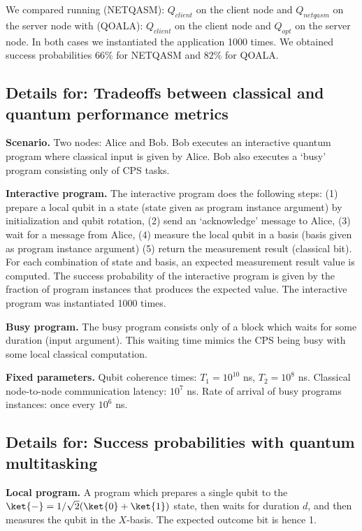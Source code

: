 We compared running (NETQASM): $Q_{client}$ on the client node and $Q_{netqasm}$ on the server node with (QOALA): $Q_{client}$ on the client node and $Q_{opt}$ on the server node. In both cases we instantiated the application 1000 times.
We obtained success probabilities $66\%$ for NETQASM and $82\%$ for QOALA.


\subsection{Details for: Tradeoffs between classical and quantum performance metrics}
\textbf{Scenario.}
Two nodes: Alice and Bob.
Bob executes an interactive quantum program where classical input is given by Alice.
Bob also executes a `busy' program consisting only of CPS tasks.

\textbf{Interactive program.}
The interactive program does the following steps:
(1) prepare a local qubit in a state (state given as program instance argument) by initialization and qubit rotation,
(2) send an `acknowledge' message to Alice,
(3) wait for a message from Alice,
(4) measure the local qubit in a basis (basis given as program instance argument)
(5) return the measurement result (classical bit).
For each combination of state and basis, an expected measurement result value is computed.
The success probability of the interactive program is given by the fraction of program instances that produces the expected value.
The interactive program was instantiated 1000 times.

\textbf{Busy program.}
The busy program consists only of a block which waits for some duration (input argument).
This waiting time mimics the CPS being busy with some local classical computation.

\textbf{Fixed parameters.}
Qubit coherence times: $T_1 = 10^{10}$ ns, $T_2 = 10^8$ ns.
Classical node-to-node communication latency: $10^7$ ns.
Rate of arrival of busy programs instances: once every $10^6$ ns.


\subsection{Details for: Success probabilities with quantum multitasking}
\textbf{Local program.}
A program which prepares a single qubit to the $\ket{-} = 1/\sqrt{2} (\ket{0} + \ket{1})$ state, then waits for duration $d$, and then measures the qubit in the $X$-basis. The expected outcome bit is hence 1.

